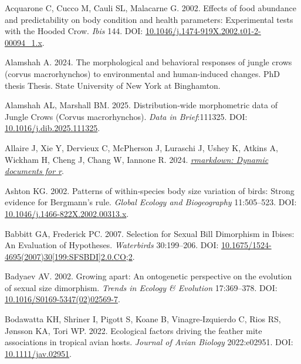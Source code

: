 \documentclass[10pt,a4paper]{article}
\newlength{\cslhangindent}
\newenvironment{CSLReferences}[2] %
 {\begin{list}{}{%
  \setlength{\itemindent}{0pt}
  \setlength{\leftmargin}{0pt}
  \setlength{\parsep}{0pt}
  \ifodd #1
   \setlength{\leftmargin}{\cslhangindent}
   \setlength{\itemindent}{-1\cslhangindent}
  \fi
  \setlength{\itemsep}{#2\baselineskip}}}
 {\end{list}}
\begin{document}
\label{refs}
\begin{CSLReferences}{1}{0}
Acquarone C, Cucco M, Cauli SL, Malacarne G. 2002. Effects of food abundance and predictability on body condition and health parameters: Experimental tests with the {Hooded} {Crow}. \emph{Ibis} 144. DOI: \href{https://doi.org/10.1046/j.1474-919X.2002.t01-2-00094_1.x}{10.1046/j.1474-919X.2002.t01-2-00094\_1.x}.

Alamshah A. 2024. The morphological and behavioral responses of jungle crows (corvus macrorhynchos) to environmental and human-induced changes. PhD thesis Thesis. State University of New York at Binghamton.

Alamshah AL, Marshall BM. 2025. Distribution-wide morphometric data of {Jungle} {Crows} ({Corvus} macrorhynchos). \emph{Data in Brief}:111325. DOI: \href{https://doi.org/10.1016/j.dib.2025.111325}{10.1016/j.dib.2025.111325}.

Allaire J, Xie Y, Dervieux C, McPherson J, Luraschi J, Ushey K, Atkins A, Wickham H, Cheng J, Chang W, Iannone R. 2024. \emph{\href{https://github.com/rstudio/rmarkdown}{{rmarkdown}: Dynamic documents for r}}.

Ashton KG. 2002. Patterns of within‐species body size variation of birds: Strong evidence for {Bergmann}'s rule. \emph{Global Ecology and Biogeography} 11:505--523. DOI: \href{https://doi.org/10.1046/j.1466-822X.2002.00313.x}{10.1046/j.1466-822X.2002.00313.x}.

Babbitt GA, Frederick PC. 2007. Selection for {Sexual} {Bill} {Dimorphism} in {Ibises}: {An} {Evaluation} of {Hypotheses}. \emph{Waterbirds} 30:199--206. DOI: \href{https://doi.org/10.1675/1524-4695(2007)30\%5B199:SFSBDI\%5D2.0.CO;2}{10.1675/1524-4695(2007)30{[}199:SFSBDI{]}2.0.CO;2}.

Badyaev AV. 2002. Growing apart: An ontogenetic perspective on the evolution of sexual size dimorphism. \emph{Trends in Ecology \& Evolution} 17:369--378. DOI: \href{https://doi.org/10.1016/S0169-5347(02)02569-7}{10.1016/S0169-5347(02)02569-7}.

Bodawatta KH, Shriner I, Pigott S, Koane B, Vinagre‐Izquierdo C, Rios RS, Jønsson KA, Tori WP. 2022. Ecological factors driving the feather mite associations in tropical avian hosts. \emph{Journal of Avian Biology} 2022:e02951. DOI: \href{https://doi.org/10.1111/jav.02951}{10.1111/jav.02951}.


\end{CSLReferences}
\end{document}
